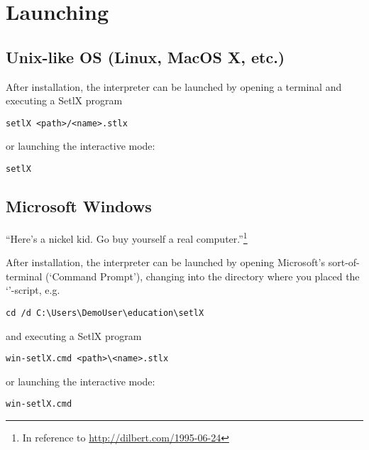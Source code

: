 \section{Launching}

\subsection{Unix-like OS (Linux, MacOS X, etc.)}

After installation, the \setlX{} interpreter can be launched by opening a terminal and executing a SetlX program

\begin{lstlisting}[frame=none,numbers=none]
setlX <path>/<name>.stlx
\end{lstlisting}

or launching the interactive mode:

\begin{lstlisting}[frame=none,numbers=none]
setlX
\end{lstlisting}

\subsection{Microsoft Windows}

\begin{center}
\large
``Here's a nickel kid. Go buy yourself a real computer.''\footnote{In reference to \url{http://dilbert.com/1995-06-24}}
\end{center}

After installation, the \setlX{} interpreter can be launched by opening Microsoft's sort-of-terminal (`Command Prompt'), changing into the directory where you placed the `'-script, e.g.

\begin{lstlisting}[frame=none,numbers=none]
cd /d C:\Users\DemoUser\education\setlX
\end{lstlisting}

and executing a SetlX program

\begin{lstlisting}[frame=none,numbers=none]
win-setlX.cmd <path>\<name>.stlx
\end{lstlisting}

or launching the interactive mode:

\begin{lstlisting}[frame=none,numbers=none]
win-setlX.cmd
\end{lstlisting}

